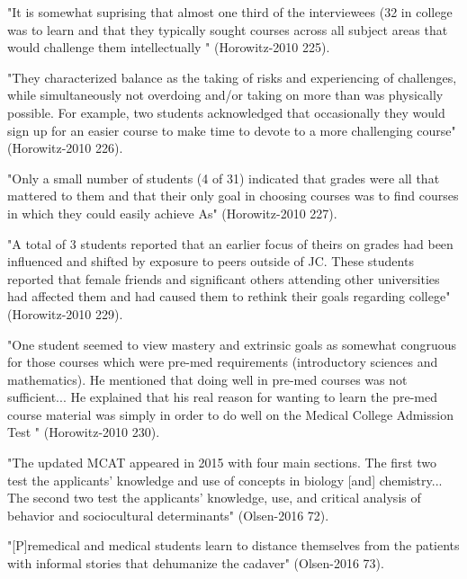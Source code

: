 

"It is somewhat suprising that almost
one third of the interviewees (32%
in college was to learn and that they typically sought courses across all subject
areas that would challenge them intellectually " (Horowitz-2010 225).

"They
characterized balance as the taking of risks and experiencing of challenges, while simultaneously not overdoing and/or taking on more than was physically possible. For example, two students acknowledged that occasionally they would sign up for an easier course to make time to devote to a more challenging course" (Horowitz-2010 226).


"Only a small number of students (4 of 31) indicated that grades were all that mattered to them and that their only goal in choosing courses was to find courses in which they could easily achieve As" (Horowitz-2010 227).

"A total of 3 students reported that an earlier focus of theirs on grades had been
influenced and shifted by exposure to peers outside of JC. These students reported
that female friends and significant others attending other universities had affected
them and had caused them to rethink their goals regarding college" (Horowitz-2010 229).

"One student seemed to view mastery and extrinsic goals as somewhat congruous for those courses which were pre-med requirements (introductory sciences and mathematics). He mentioned that doing well in pre-med courses was not sufficient... He explained that his real reason for wanting to learn the pre-med course material was simply in order to do well on the Medical College Admission Test " (Horowitz-2010 230).




"The updated MCAT appeared in 2015 with four main sections. The first two test the applicants' knowledge and use of concepts in biology [and] chemistry... The second two test the applicants' knowledge, use, and critical analysis of behavior and sociocultural determinants" (Olsen-2016 72).

"[P]remedical and medical students learn to distance themselves from the patients with informal stories that dehumanize the cadaver" (Olsen-2016 73).

